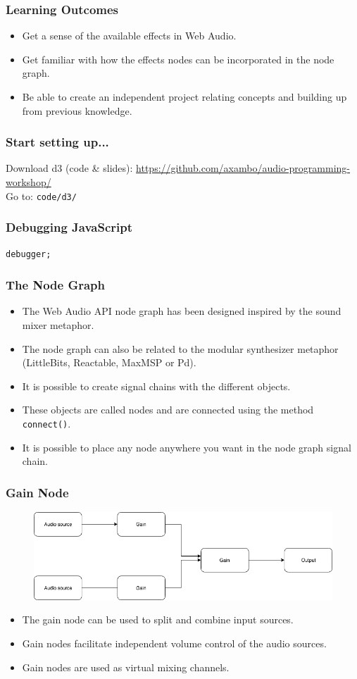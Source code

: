 \documentclass[screen, aspectratio=43]{beamer}
\begin{document}
%
\begin{frame}
\frametitle{Learning Outcomes}
\begin{itemize}
\item Get a sense of the available effects in Web Audio.
\item Get familiar with how the effects nodes can be incorporated in the node graph.
\item Be able to create an independent project relating concepts and building up from previous knowledge.
\end{itemize}
\end{frame}
%
\begin{frame}
\frametitle{Start setting up...}
Download d3 (code \& slides): \url{https://github.com/axambo/audio-programming-workshop/} 
\\
\vspace{10 mm}
Go to: \texttt{code/d3/}
\end{frame}
%	
\begin{frame}
\frametitle{Debugging JavaScript}
 \texttt{debugger;} 
\end{frame}
%
\begin{frame}
\frametitle{The Node Graph}
\begin{itemize}
\item The Web Audio API node graph has been designed inspired by the sound mixer metaphor. 
\item The node graph can also be related to the modular synthesizer metaphor (LittleBits, Reactable, MaxMSP or Pd).
\item It is possible to create signal chains with the different objects.
\item These objects are called nodes and are connected using the method \texttt{connect()}.
\item It is possible to place any node anywhere you want in the node graph signal chain.
\end{itemize}
\end{frame}
%
\begin{frame}
\frametitle{Gain Node}
   \begin{figure}
	\includegraphics[scale=0.35]{img/Routing-audio-nodes-01-two-oscillators.png}
   \end{figure}
\begin{itemize}
\item The gain node can be used to split and combine input sources.
\item Gain nodes facilitate independent volume control of the audio sources.
\item Gain nodes are used as virtual mixing channels.
\end{itemize}
\end{frame}
\end{document}
